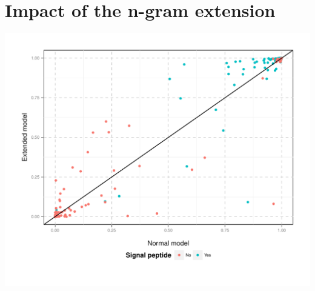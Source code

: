 \documentclass[10pt]{beamer}\usepackage[]{graphicx}\usepackage[]{color}
\makeatletter
\def\maxwidth{ %
  \ifdim\Gin@nat@width>\linewidth
    \linewidth
  \else
    \Gin@nat@width
  \fi
}
\makeatother
\begin{document}

\section{Impact of the n-gram extension}

\begin{frame}

\includegraphics[width=\maxwidth]{figure/unnamed-chunk-2-1} 

\end{frame}
\end{document}
